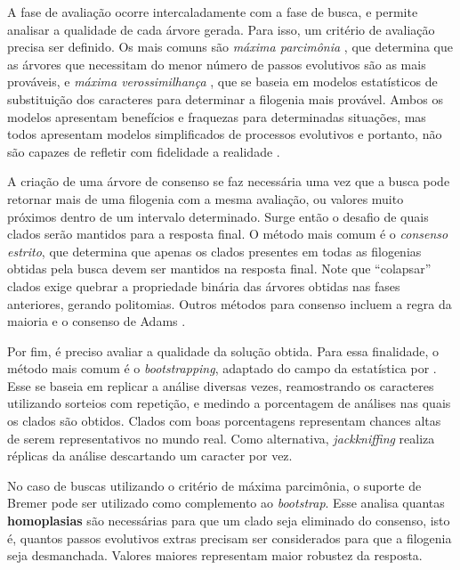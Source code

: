 \documentclass[12pt]{article}
\begin{document}
A fase de avaliação ocorre intercaladamente com a fase de busca, e permite analisar a qualidade de cada árvore gerada. Para isso, um critério de avaliação precisa ser definido. Os mais comuns são \emph{máxima parcimônia} \cite{maximum-parsimony}, que determina que as árvores que necessitam do menor número de passos evolutivos são as mais prováveis, e \emph{máxima verossimilhança} \cite{cavalli1967phylogenetic, maximum-likelihood}, que se baseia em modelos estatísticos de substituição dos caracteres para determinar a filogenia mais provável. Ambos os modelos apresentam benefícios e fraquezas para determinadas situações, mas todos apresentam modelos simplificados de processos evolutivos e portanto, não são capazes de refletir com fidelidade a realidade \cite{cavalli1967phylogenetic}.

A criação de uma árvore de consenso se faz necessária uma vez que a busca pode retornar mais de uma filogenia com a mesma avaliação, ou valores muito próximos dentro de um intervalo determinado. Surge então o desafio de quais clados serão mantidos para a resposta final. O método mais comum é o \emph{consenso estrito}, que determina que apenas os clados presentes em todas as filogenias obtidas pela busca devem ser mantidos na resposta final. Note que ``colapsar'' clados exige quebrar a propriedade binária das árvores obtidas nas fases anteriores, gerando politomias. Outros métodos para consenso incluem a regra da maioria \cite{majority-rule} e o consenso de Adams \cite{adams}.

Por fim, é preciso avaliar a qualidade da solução obtida. Para essa finalidade, o método mais comum é o \emph{bootstrapping}, adaptado do campo da estatística por \cite{bootstrap}. Esse se baseia em replicar a análise diversas vezes, reamostrando os caracteres utilizando sorteios com repetição, e medindo a porcentagem de análises nas quais os clados são obtidos. Clados com boas porcentagens representam chances altas de serem representativos no mundo real. Como alternativa, \emph{jackkniffing} realiza réplicas da análise descartando um caracter por vez.

No caso de buscas utilizando o critério de máxima parcimônia, o suporte de Bremer \cite{bremer-support} pode ser utilizado como complemento ao \emph{bootstrap}. Esse analisa quantas \textbf{homoplasias} são necessárias para que um clado seja eliminado do consenso, isto é, quantos passos evolutivos extras precisam ser considerados para que a filogenia seja desmanchada. Valores maiores representam maior robustez da resposta.
\end{document}

